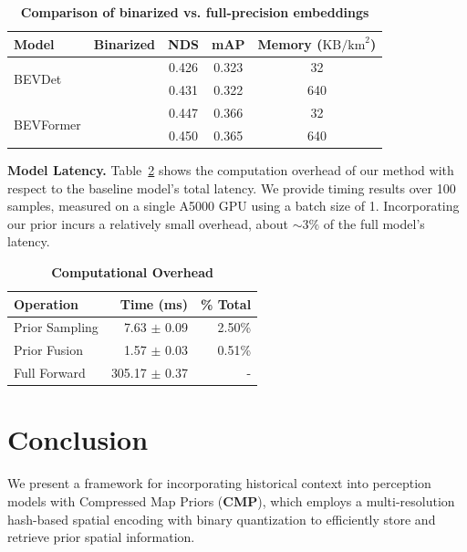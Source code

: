 \documentclass{article} %
\newcommand{\myparagraph}[1]{\vspace{0.2em}\noindent\textbf{#1}}
\newcommand{\tablestyle}[2]{\setlength{\tabcolsep}{#1}\renewcommand{\arraystretch}{#2}\centering\small}
\newcommand{\name}{Compressed\xspace}
\newcommand{\ours}{CMP\xspace}
\newcommand{\oursbold}{\textbf{\ours}\xspace}
\begin{document}
\begin{table}[t]
	\centering
	\tablestyle{2pt}{1.0}
	\begin{tabular}{lcccc}
	\toprule
	Model & Binarized & NDS & mAP & Memory ($\text{KB}/\text{km}^2$) \\
	\midrule
	\multirow{2}{*}{BEVDet} & \checkmark & 0.426 & 0.323 & 32 \\
	                        &             & 0.431 & 0.322 & 640 \\
	\midrule
	\multirow{2}{*}{BEVFormer} & \checkmark & 0.447 & 0.366 & 32 \\
	                           &             & 0.450 & 0.365 & 640 \\
	\bottomrule
	\end{tabular}
	\caption{\textbf{Comparison of binarized vs. full-precision embeddings}}
	\label{tab:binarization}
\end{table}

\myparagraph{Model Latency.}
Table~\ref{tab:computation} shows the computation overhead of our method with respect to the baseline model's total latency.
We provide timing results over 100 samples, measured on a single A5000 GPU using a batch size of 1.
Incorporating our prior incurs a relatively small overhead, about $\sim 3\%$ of the full model's latency.

\begin{table}[H]
	\centering
	\tablestyle{3pt}{1.05}
	\begin{tabular}{lrr}
		\toprule
		Operation & Time (ms) & \% Total \\
		\midrule
		Prior Sampling & 7.63 $\pm$ 0.09 & 2.50\% \\
		Prior Fusion & 1.57 $\pm$ 0.03 & 0.51\% \\
		Full Forward & 305.17 $\pm$ 0.37 & - \\
		\bottomrule
	\end{tabular}
	\caption{\textbf{Computational Overhead}}
	\label{tab:computation}
\end{table}

\section{Conclusion}
\label{sec:conclusion}

We present a framework for incorporating historical context into perception models with \name Map Priors (\oursbold), which employs a multi-resolution hash-based spatial encoding with binary quantization to efficiently store and retrieve prior spatial information.
\end{document}
